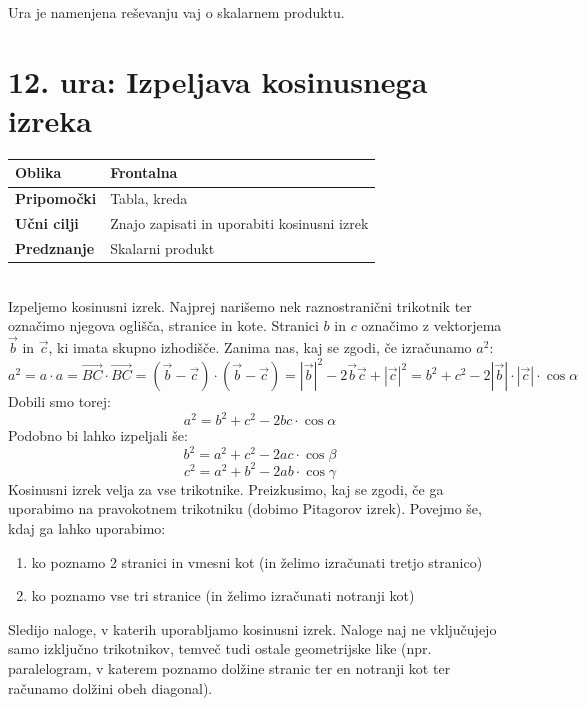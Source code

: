 \documentclass[a4paper,11pt]{article}
\begin{document}
Ura je namenjena reševanju vaj o skalarnem produktu. 
\newpage
\section{12. ura: Izpeljava kosinusnega izreka}
\begin{tabularx}{\textwidth}{|>{\bfseries\RaggedRight}p{2.7cm}|X|}
\hline
Oblika & Frontalna \\ \hline
Pripomočki & Tabla, kreda \\ \hline
Učni cilji & Znajo zapisati in uporabiti kosinusni izrek \\ \hline
Predznanje & Skalarni produkt\\ \hline

\end{tabularx}
\\

Izpeljemo kosinusni izrek. Najprej narišemo nek raznostranični trikotnik ter označimo njegova oglišča, stranice in kote. Stranici $b$ in $c$ označimo z vektorjema $\vec{b}$ in $\vec{c}$, ki imata skupno izhodišče.
Zanima nas, kaj se zgodi, če izračunamo $a^2$: $$a^2=a\cdot a=\vec{BC}\cdot \vec{BC}=(\vec{b}-\vec{c})\cdot (\vec{b}-\vec{c})= |\vec{b}|^2-2\vec{b}\vec{c}+|\vec{c}|^2=b^2+c^2-2|\vec{b}|\cdot|\vec{c}|\cdot\cos\alpha$$
Dobili smo torej: $$a^2=b^2+c^2-2bc\cdot\cos\alpha$$
Podobno bi lahko izpeljali še: $$b^2=a^2+c^2-2ac\cdot\cos\beta$$
$$c^2=a^2+b^2-2ab\cdot\cos\gamma$$
Kosinusni izrek velja za vse trikotnike. Preizkusimo, kaj se zgodi, če ga uporabimo na pravokotnem trikotniku (dobimo Pitagorov izrek).
Povejmo še, kdaj ga lahko uporabimo:
\begin{enumerate}
    \item ko poznamo 2 stranici in vmesni kot (in želimo izračunati tretjo stranico)
    \item ko poznamo vse tri stranice (in želimo izračunati notranji kot)
\end{enumerate}
Sledijo naloge, v katerih uporabljamo kosinusni izrek. Naloge naj ne vključujejo samo izključno trikotnikov, temveč tudi ostale geometrijske like 
(npr. paralelogram, v katerem poznamo dolžine stranic ter en notranji kot ter računamo dolžini obeh diagonal).


\newpage
\end{document}
